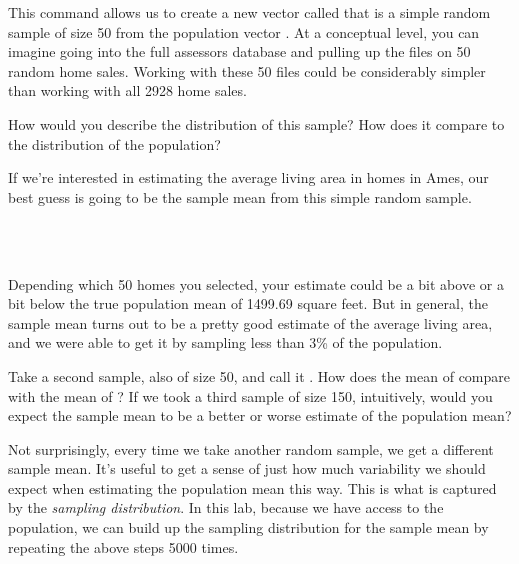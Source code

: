 \documentclass[11pt]{article}
\begin{document}
This command allows us to create a new vector called \texttt{} that is a simple random sample of size 50 from the population vector \texttt{}.  At a conceptual level, you can imagine going into the full assessors database and pulling up the files on 50 random home sales.  Working with these 50 files could be considerably simpler than working with all 2928 home sales.

\begin{exercise}
How would you describe the distribution of this sample?   How does it compare to the distribution of the population?
\end{exercise}

If we're interested in estimating the average living area in homes in Ames, our best guess is going to be the sample mean from this simple random sample.

\ttfamily\noindent
\hlstd{}\hspace*{\fill}\\
\hlstd{}\hlkeyword{(}\hlkeyword{)}\hspace*{\fill}\\
\normalfont

Depending which 50 homes you selected, your estimate could be a bit above or a bit below the true population mean of 1499.69 square feet.  But in general, the sample mean turns out to be a pretty good estimate of the average living area, and we were able to get it by sampling less than 3\% of the population.

\begin{exercise}
Take a second sample, also of size 50, and call it \texttt{}.  How does the mean of \texttt{} compare with the mean of \texttt{}?  If we took a third sample of size 150, intuitively, would you expect the sample mean to be a better or worse estimate of the population mean?
\end{exercise}

Not surprisingly, every time we take another random sample, we get a different sample mean.  It's useful to get a sense of just how much variability we should expect when estimating the population mean this way.  This is what is captured by the \emph{sampling distribution}.  In this lab, because we have access to the population, we can build up the sampling distribution for the sample mean by repeating the above steps 5000 times.

\pagebreak
\end{document}
